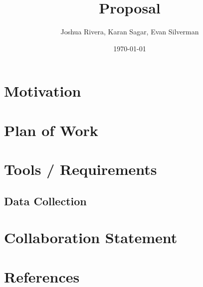 \documentclass[11pt]{article}
\author{Joshua Rivera, Karan Sagar, Evan Silverman}
\date{\today}
\title{Proposal}
\begin{document}
\maketitle
\tableofcontents


\section{Motivation}
\label{sec:orgbd0ad13}
\section{Plan of Work}
\label{sec:orgeb79d8c}
\section{Tools / Requirements}
\label{sec:org640ee6c}
\subsection{Data Collection}
\label{sec:org3849a77}
\section{Collaboration Statement}
\label{sec:org3b32c10}
\section{References}
\label{sec:org0a33948}
\end{document}
